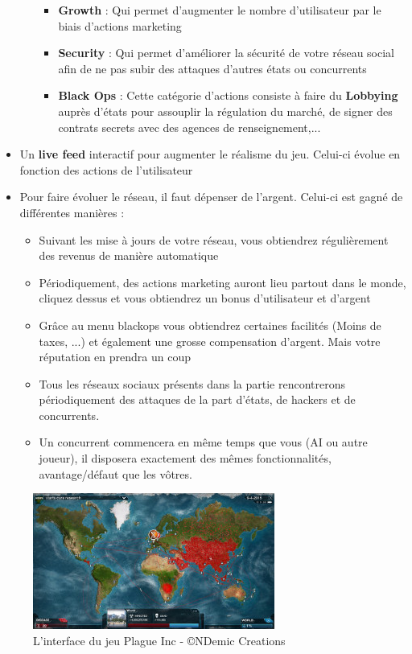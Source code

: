 \begin{itemize}
\begin{itemize}
        \begin{itemize}
            \item \textbf{Growth} : Qui permet d'augmenter le nombre d'utilisateur par le biais d'actions marketing
            \item \textbf{Security} : Qui permet d'améliorer la sécurité de votre réseau social afin de ne pas subir des attaques d'autres états ou concurrents
            \item \textbf{Black Ops} : Cette catégorie d'actions consiste à faire du \textbf{Lobbying} auprès d'états pour assouplir la régulation du marché, de signer des contrats secrets avec des agences de renseignement,...
        \end{itemize}
        \end{itemize}
        \item{Un \textbf{live feed} interactif pour augmenter le réalisme du jeu. Celui-ci évolue en fonction des actions de l'utilisateur}
        \item Pour faire évoluer le réseau, il faut dépenser de l'argent. Celui-ci est gagné de différentes manières : 
        \begin{itemize}
            \item Suivant les mise à jours de votre réseau, vous obtiendrez régulièrement des revenus de manière automatique
            \item Périodiquement, des actions marketing auront lieu partout dans le monde, cliquez dessus et vous obtiendrez un bonus d'utilisateur et d'argent
            \item Grâce au menu blackops vous obtiendrez certaines facilités (Moins de taxes, ...) et également une grosse compensation d'argent. Mais votre réputation en prendra un coup
        \item Tous les réseaux sociaux présents dans la partie rencontrerons périodiquement des attaques de la part d'états, de hackers et de concurrents.
        \item Un concurrent commencera en même temps que vous (AI ou autre joueur), il disposera exactement des mêmes fonctionnalités, avantage/défaut que les vôtres.
    \end{itemize}
    
\end{itemize}
\begin{figure}
\begin{center}
\includegraphics{images/plagueIncMap.jpg}
\end{center}
\caption{L'interface du jeu Plague Inc - \copyright NDemic Creations }
\label{plagueIncMap}
\end{figure}
